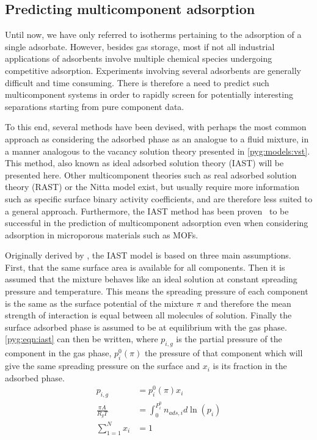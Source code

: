 
\subsection{Predicting multicomponent adsorption}\label{pyg:iast}

Until now, we have only referred to isotherms pertaining to the adsorption
of a single adsorbate. However, besides gas storage, most if not all
industrial applications of adsorbents involve multiple chemical
species undergoing competitive adsorption. Experiments involving
several adsorbents are generally difficult and time consuming.
There is therefore a need to predict such multicomponent systems
in order to rapidly screen for potentially interesting separations
starting from pure component data.

To this end, several methods have been devised, with perhaps
the most common approach as considering the adsorbed phase as
an analogue to a fluid mixture, in a manner analogous to the
vacancy solution theory presented in \autoref{pyg:models:vst}.
This method, also known as ideal adsorbed solution theory (IAST)
will be presented here. Other multicomponent theories
such as real adsorbed solution theory (RAST) or the Nitta model
exist, but usually require more information such as specific
surface binary activity coefficients, and are therefore less suited to
a general approach. Furthermore, the IAST method has been
proven~\cite{cessfordEvaluationIdealAdsorbed2012,%
	vanheestIdentificationMetalOrganic2012} to be successful in the
prediction of multicomponent adsorption even when considering
adsorption in microporous materials such as MOFs.

Originally derived by \citet{myersThermodynamicsMixedgasAdsorption1965},
the IAST model is based on three main assumptions. First, that the
same surface area is available for all components. Then it is
assumed that the mixture behaves like an ideal solution at constant
spreading pressure and temperature. This means the spreading pressure of
each component is the same as the surface potential of the mixture \(\pi\)
and therefore the mean strength of interaction is equal between all
molecules of solution. Finally the surface adsorbed phase is assumed
to be at equilibrium with the gas phase. \autoref{pyg:eqn:iast}
can then be written, where \(p_{i,g}\) is the partial pressure of
the component in the gas phase, \( p_i^0(\pi)\) the pressure of
that component which will give the same spreading pressure on the
surface and \(x_i\) is its fraction in the adsorbed phase.
%
\begin{align}
	p_{i,g}             & = p_i^0(\pi)x_i                              %
	\label{pyg:eqn:iast}                                               \\
	\frac{\pi A}{R_g T} & = \int_{0}^{P_{i}^{0}} n_{ads,i} d\ln{(p_i)} %
	\label{pyg:eqn:iast-2}                                             \\
	\sum_{1=1}^{N} x_i  & = 1                                          %
	\label{pyg:eqn:iast-3}
\end{align}

